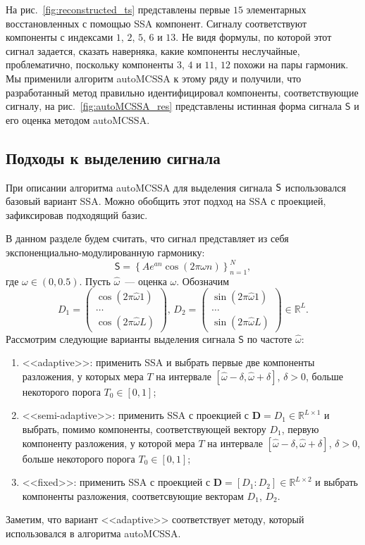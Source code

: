 \documentclass[specialist,
substylefile = spbu_report.rtx,
subf,href,colorlinks=true, 12pt]{disser}
\theoremstyle{definition}
\begin{document}
На рис.~\ref{fig:reconstructed_ts} представлены первые $15$ элементарных восстановленных с помощью SSA компонент. Сигналу соответствуют компоненты с индексами $1$, $2$, $5$, $6$ и $13$. Не видя формулы, по которой этот сигнал задается, сказать наверняка, какие компоненты неслучайные, проблематично, поскольку компоненты $3$, $4$ и $11$, $12$ похожи на пары гармоник. Мы применили алгоритм autoMCSSA к этому ряду и получили, что разработанный метод правильно идентифицировал компоненты, соответствующие сигналу, на рис.~\ref{fig:autoMCSSA_res} представлены истинная форма сигнала $\mathsf{S}$ и его оценка методом autoMCSSA.

\subsection{Подходы к выделению сигнала}

При описании алгоритма autoMCSSA для выделения сигнала $\mathsf{S}$ использовался базовый вариант SSA. Можно обобщить этот подход на SSA с проекцией, зафиксировав подходящий базис.

В данном разделе будем считать, что сигнал представляет из себя экспоненциально-модулированную гармонику:
$$
\mathsf{S}=\left\{Ae^{a n}\cos(2\pi\omega n)\right\}_{n=1}^N,
$$
где $\omega\in(0, 0.5)$. Пусть $\hat\omega$~--- оценка $\omega$. Обозначим
$$
D_1=\begin{pmatrix}
    \cos(2\pi\hat\omega 1)\\
    \ldots\\
    \cos(2\pi\hat\omega L)
    \end{pmatrix}, \,
D_2=\begin{pmatrix}
    \sin(2\pi\hat\omega 1)\\
    \ldots\\
    \sin(2\pi\hat\omega L)
\end{pmatrix}\in \mathbb{R}^L.
$$
Рассмотрим следующие варианты выделения сигнала $\mathsf{S}$ по частоте $\hat \omega$:
\begin{enumerate}
    \item <<adaptive>>: применить SSA и выбрать первые две компоненты разложения, у которых мера $T$ на интервале $[\hat\omega-\delta, \hat\omega+\delta]$, $\delta>0$, больше некоторого порога $T_0\in[0, 1]$;
    \item  <<semi-adaptive>>: применить SSA с проекцией с $\mathbf{D}=D_1\in \mathbb{R}^{L\times 1}$ и выбрать, помимо компоненты, соответствующей вектору $D_1$, первую компоненту разложения, у которой мера $T$ на интервале $[\hat\omega-\delta, \hat\omega+\delta]$, $\delta>0$, больше некоторого порога $T_0\in[0, 1]$;
    \item <<fixed>>: применить SSA с проекцией с $\mathbf{D}=[D_1:D_2]\in\mathbb{R}^{L\times 2}$ и выбрать компоненты разложения, соответсвующие векторам $D_1$, $D_2$.
\end{enumerate}
Заметим, что вариант <<adaptive>> соответствует методу, который использовался в алгоритма autoMCSSA.
\end{document}
